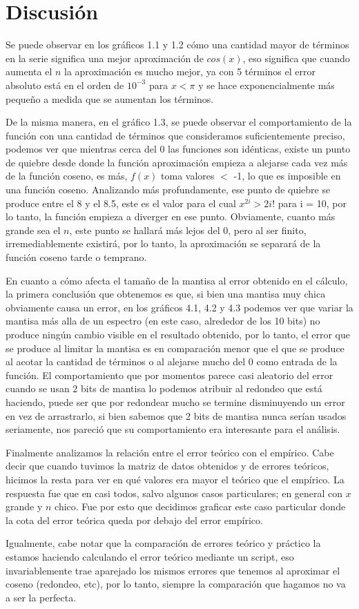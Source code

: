 \section{Discusión}

Se puede observar en los gráficos 1.1 y 1.2 cómo una cantidad mayor de términos en la serie significa una mejor aproximación de $cos(x)$, eso significa que cuando aumenta el $n$ la aproximación es mucho mejor, ya con 5 términos el error absoluto está en el orden de $10^{-3}$ para $x < \pi$ y se hace exponencialmente más pequeño a medida que se aumentan los términos.

De la misma manera, en el gráfico 1.3, se puede observar el comportamiento de la función con una cantidad de términos que consideramos suficientemente preciso, podemos ver que mientras cerca del 0 las funciones son idénticas, existe un punto de quiebre desde donde la función aproximación empieza a alejarse cada vez más de la función coseno, es más, $f(x)$ toma valores $<$ -1, lo que es imposible en una función coseno. Analizando más profundamente, ese punto de quiebre se produce entre el 8 y el 8.5, este es el valor para el cual $x^{2i} > 2i!$ para i = 10, por lo tanto, la función empieza a diverger en ese punto. Obviamente, cuanto más grande sea el $n$, este punto se hallará más lejos del 0, pero al ser finito, irremediablemente existirá, por lo tanto, la aproximación se separará de la función coseno tarde o temprano.

En cuanto a cómo afecta el tamaño de la mantisa al error obtenido en el cálculo, la primera conclusión que obtenemos es que, si bien una mantisa muy chica obviamente causa un error, en los gráficos 4.1, 4.2 y 4.3 podemos ver que variar la mantisa más alla de un espectro (en este caso, alrededor de los 10 bits) no produce ningún cambio visible en el resultado obtenido, por lo tanto, el error que se produce al limitar la mantisa es en comparación menor que el que se produce al acotar la cantidad de términos o al alejarse mucho del 0 como entrada de la función. El comportamiento que por momentos parece casi aleatorio del error cuando se usan 2 bits de mantisa lo podemos atribuir al redondeo que está haciendo, puede ser que por redondear mucho se termine disminuyendo un error en vez de arrastrarlo, si bien sabemos que 2 bits de mantisa nunca serían usados seriamente, nos pareció que su comportamiento era interesante para el análisis.


Finalmente analizamos la relación entre el error teórico con el empírico.
Cabe decir que cuando tuvimos la matriz de datos obtenidos y de errores teóricos, hicimos la resta para ver en qué
valores era mayor el teórico que el empírico. La respuesta fue que en casi todos, salvo algunos casos particulares; en
general con $x$ grande y $n$ chico. Fue por esto que decidimos graficar este caso particular donde la cota del error
teórica queda por debajo del error empírico.

Igualmente, cabe notar que la comparación de errores teórico y práctico la estamos haciendo calculando el error teórico mediante un script, eso invariablemente trae aparejado los mismos errores que tenemos al aproximar el coseno (redondeo, etc), por lo tanto, siempre la comparación que hagamos no va a ser la perfecta.
